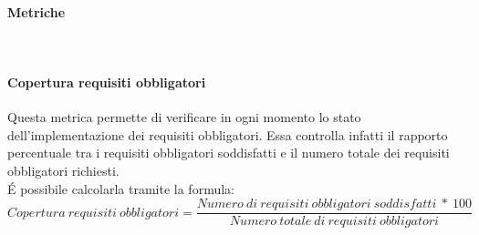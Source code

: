\documentclass[../NormeDiProgetto.tex]{subfiles}
\begin{document}
				\paragraph{Metriche}\mbox{}\\
				\paragraph{Copertura requisiti obbligatori}
			Questa metrica permette di verificare in ogni momento lo stato dell'implementazione dei requisiti obbligatori. Essa controlla infatti il rapporto percentuale tra i requisiti obbligatori soddisfatti e il numero totale dei requisiti obbligatori richiesti.\\
				É possibile calcolarla tramite la formula:
				\begin{equation*}
					Copertura \ requisiti \ obbligatori = \frac{Numero \ di \ requisiti \ obbligatori \ soddisfatti \ * \ 100}{Numero \ totale \ di \ requisiti \ obbligatori}
				\end{equation*}
\end{document}
